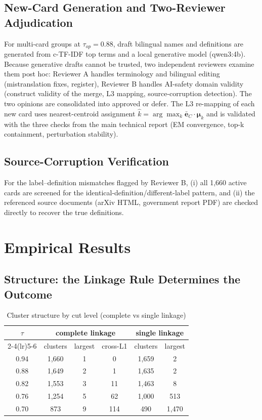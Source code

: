 \documentclass[11pt,a4paper]{article}
\begin{document}
\subsection{New-Card Generation and Two-Reviewer Adjudication}

For multi-card groups at $\tau_{op}=0.88$, draft bilingual names and definitions are generated from c-TF-IDF top terms and a local generative model (qwen3:4b). Because generative drafts cannot be trusted, two independent reviewers examine them post hoc: Reviewer A handles terminology and bilingual editing (mistranslation fixes, register), Reviewer B handles AI-safety domain validity (construct validity of the merge, L3 mapping, source-corruption detection). The two opinions are consolidated into approved or defer. The L3 re-mapping of each new card uses nearest-centroid assignment $\hat{k}=\arg\max_k \bar{\mathbf{e}}_C\cdot\boldsymbol{\mu}_k$ and is validated with the three checks from the main technical report (EM convergence, top-k containment, perturbation stability).

\subsection{Source-Corruption Verification}

For the label--definition mismatches flagged by Reviewer B, (i) all 1,660 active cards are screened for the identical-definition/different-label pattern, and (ii) the referenced source documents (arXiv HTML, government report PDF) are checked directly to recover the true definitions.

\section{Empirical Results}

\subsection{Structure: the Linkage Rule Determines the Outcome}

\begin{table}[htbp]
\centering
\caption{Cluster structure by cut level (complete vs single linkage)}
\begin{tabular}{cccccc}
\toprule
$\tau$ & \multicolumn{3}{c}{complete linkage} & \multicolumn{2}{c}{single linkage} \\
\cmidrule(lr){2-4}\cmidrule(lr){5-6}
 & clusters & largest & cross-L1 & clusters & largest \\
\midrule
0.94 & 1,660 & 1 & 0 & 1,659 & 2 \\
0.88 & 1,649 & 2 & 1 & 1,635 & 2 \\
0.82 & 1,553 & 3 & 11 & 1,463 & 8 \\
0.76 & 1,254 & 5 & 62 & 1,000 & 513 \\
0.70 & 873 & 9 & 114 & 490 & 1,470 \\
\bottomrule
\end{tabular}
\end{table}
\end{document}
